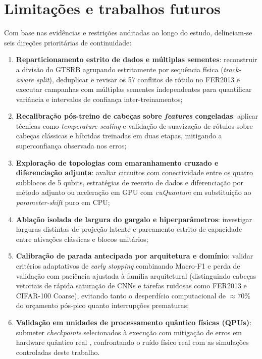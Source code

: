 \documentclass[
    12pt,
    openright,
    oneside,
    a4paper,
    english,
    brazil
]{abntex2}
\begin{document}
\section{Limitações e trabalhos futuros}

Com base nas evidências e restrições auditadas ao longo do estudo, delineiam-se seis direções prioritárias de continuidade:
\begin{enumerate}
    \item \textbf{Reparticionamento estrito de dados e múltiplas sementes}: reconstruir a divisão do GTSRB agrupando estritamente por sequência física (\textit{track-aware split}), deduplicar e revisar os 57 conflitos de rótulo no FER2013 e executar campanhas com múltiplas sementes independentes para quantificar variância e intervalos de confiança inter-treinamentos;
    \item \textbf{Recalibração pós-treino de cabeças sobre \textit{features} congeladas}: aplicar técnicas como \textit{temperature scaling} \cite{guo2017calibration} e validação de suavização de rótulos sobre cabeças clássicas e híbridas treinadas em duas etapas, mitigando a superconfiança observada nos erros;
    \item \textbf{Exploração de topologias com emaranhamento cruzado e diferenciação adjunta}: avaliar circuitos com conectividade entre os quatro subblocos de 5 qubits, estratégias de reenvio de dados \cite{perezsalinas2020data} e diferenciação por método adjunto ou aceleração em GPU com \textit{cuQuantum} \cite{faj2023warpspeed,bayraktar2023cuquantum} em substituição ao \textit{parameter-shift} puro em CPU;
    \item \textbf{Ablação isolada de largura do gargalo e hiperparâmetros}: investigar larguras distintas de projeção latente e pareamento estrito de capacidade entre ativações clássicas e blocos unitários;
    \item \textbf{Calibração de parada antecipada por arquitetura e domínio}: validar critérios adaptativos de \textit{early stopping} combinando Macro-F1 e perda de validação com paciência ajustada à família arquitetural (distinguindo cabeças vetoriais de rápida saturação de CNNs e tarefas ruidosas como FER2013 e CIFAR-100 Coarse), evitando tanto o desperdício computacional de \(\approx 70\%\) do orçamento pós-pico quanto interrupções prematuras;
    \item \textbf{Validação em unidades de processamento quântico físicas (QPUs)}: submeter \textit{checkpoints} selecionados à execução com mitigação de erros em hardware quântico real \cite{preskill2018nisq}, confrontando o ruído físico real com as simulações controladas deste trabalho.
\end{enumerate}
\end{document}
